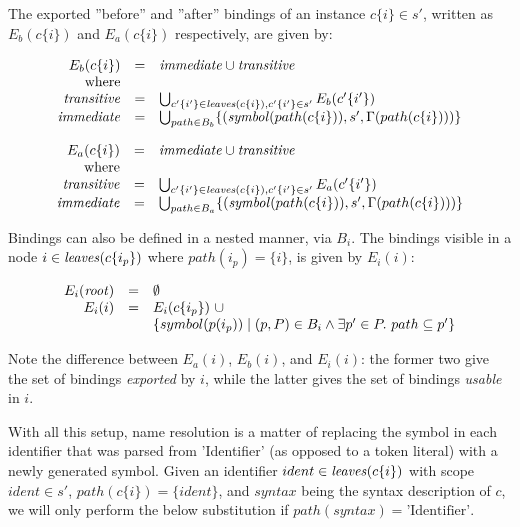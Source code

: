 \documentclass{kththesis}
\begin{document}
The exported ''before'' and ''after'' bindings of an instance $c\{i\} \in s'$, written as $E_b(c\{i\})$ and $E_a(c\{i\})$ respectively, are given by:

$$
\begin{array}{rcl}
E_b(c\{i\}) & = & \mathit{immediate} \cup \mathit{transitive} \\
\text{where} & & \\
\mathit{transitive} & = & \bigcup_{c'\{i'\} \in \mathit{leaves}(c\{i\}), c'\{i'\} \in s'} E_b(c'\{i'\}) \\
\mathit{immediate} & = & \bigcup_{path \in B_b} \{(\mathit{symbol}(path(c\{i\})), s', \Gamma(path(c\{i\})))\}
\end{array}
$$

$$
\begin{array}{rcl}
E_a(c\{i\}) & = & \mathit{immediate} \cup \mathit{transitive} \\
\text{where} & & \\
\mathit{transitive} & = & \bigcup_{c'\{i'\} \in \mathit{leaves}(c\{i\}), c'\{i'\} \in s'} E_a(c'\{i'\}) \\
\mathit{immediate} & = & \bigcup_{path \in B_a} \{(\mathit{symbol}(path(c\{i\})), s', \Gamma(path(c\{i\})))\}
\end{array}
$$

Bindings can also be defined in a nested manner, via $B_i$. The bindings visible in a node $i \in \mathit{leaves}(c\{i_p\})$ where $path(i_p) = \{i\}$, is given by $E_i(i)$:


$$
\begin{array}{rcl}
E_i(\mathit{root}) & = & \emptyset \\
E_i(i) & = & E_i(c\{i_p\})\ \cup \\
& & \{ symbol(p(i_p)) \mid (p, P) \in B_i \land \exists p' \in P.\ path \subseteq p'\} \\
\end{array}
$$

Note the difference between $E_a(i)$, $E_b(i)$, and $E_i(i)$: the former two give the set of bindings \emph{exported} by $i$, while the latter gives the set of bindings \emph{usable} in $i$.


With all this setup, name resolution is a matter of replacing the symbol in each identifier that was parsed from 'Identifier' (as opposed to a token literal) with a newly generated symbol. Given an identifier $ident \in \mathit{leaves}(c\{i\})$ with scope $ident \in s'$, $path(c\{i\}) = \{ident\}$, and $syntax$ being the syntax description of $c$, we will only perform the below substitution if $path(syntax) = \text{'Identifier'}$.
\end{document}
